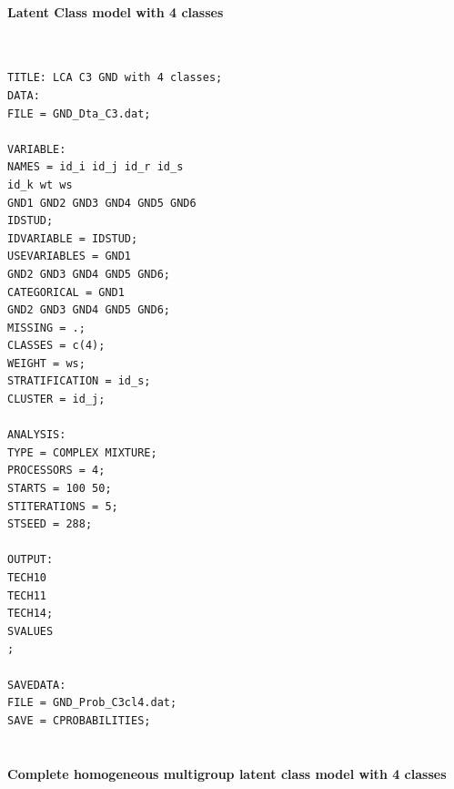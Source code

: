 \documentclass[12pt,a4paper,oneside]{reedthesis}
\begin{document}
\hypertarget{latent-class-model-with-4-classes}{%
\paragraph{Latent Class model with 4 classes}\label{latent-class-model-with-4-classes}}

~
\begin{verbatim}
TITLE: LCA C3 GND with 4 classes;
DATA: 
FILE = GND_Dta_C3.dat;

VARIABLE: 
NAMES = id_i id_j id_r id_s
id_k wt ws
GND1 GND2 GND3 GND4 GND5 GND6
IDSTUD;
IDVARIABLE = IDSTUD;
USEVARIABLES = GND1
GND2 GND3 GND4 GND5 GND6;
CATEGORICAL = GND1
GND2 GND3 GND4 GND5 GND6;
MISSING = .;
CLASSES = c(4);
WEIGHT = ws;
STRATIFICATION = id_s;
CLUSTER = id_j;
 
ANALYSIS:
TYPE = COMPLEX MIXTURE;
PROCESSORS = 4;
STARTS = 100 50;
STITERATIONS = 5;
STSEED = 288;
 
OUTPUT: 
TECH10
TECH11
TECH14;
SVALUES
;

SAVEDATA:
FILE = GND_Prob_C3cl4.dat;
SAVE = CPROBABILITIES;
 
\end{verbatim}
\hypertarget{complete-homogeneous-multigroup-latent-class-model-with-4-classes}{%
\paragraph{Complete homogeneous multigroup latent class model with 4 classes}\label{complete-homogeneous-multigroup-latent-class-model-with-4-classes}}
\end{document}

